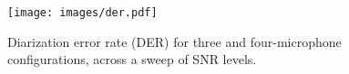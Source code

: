 

\begin{figure}
  \centering
  \texttt{[image: images/der.pdf]}
  \caption{Diarization error rate (DER) for three and four-microphone configurations, across a sweep of SNR levels.}
  \label{fig:dc_setup}  
\end{figure}









